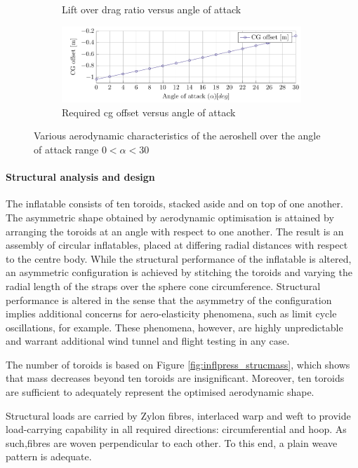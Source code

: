 \begin{figure}[h]
\begin{subfigure}[b]{0.49\textwidth}
 		\caption{Lift over drag ratio versus angle of attack}
 		\label{fig:CLCDAlpha}
 	\end{subfigure}
 	\begin{subfigure}[b]{0.49\textwidth}
 		\includegraphics[width=0.99\textwidth]{./Figure/Aerodynamics/CGoAlpha.pdf}
 		\caption{Required \gls{cg} offset versus angle of attack}
 		\label{fig:CGOAlpha}
 	\end{subfigure}
 	\caption{Various aerodynamic characteristics of the aeroshell over the angle of attack range $0<\alpha<30$}
 \end{figure}


\paragraph{Structural analysis and design}


The inflatable consists of ten toroids, stacked aside and on top of one another. The asymmetric shape obtained by aerodynamic optimisation is attained by arranging the toroids at an angle with respect to one another. The result is an assembly of circular inflatables, placed at differing radial distances with respect to the centre body. While the structural performance of the inflatable is altered, an asymmetric configuration is achieved by stitching the toroids and varying the radial length of the straps over the sphere cone circumference. Structural performance is altered in the sense that the asymmetry of the configuration implies additional concerns for aero-elasticity phenomena, such as limit cycle oscillations, for example. These phenomena, however, are highly unpredictable and warrant additional wind tunnel and flight testing in any case. 

The number of toroids is based on Figure \ref{fig:inflpress_strucmass}, which shows that mass decreases beyond ten toroids are insignificant. Moreover, ten toroids are sufficient to adequately represent the optimised aerodynamic shape. 

Structural loads are carried by Zylon fibres, interlaced warp and weft to provide load-carrying capability in all required directions: circumferential and hoop. As such,fibres are woven perpendicular to each other. To this end, a plain weave pattern is adequate.

